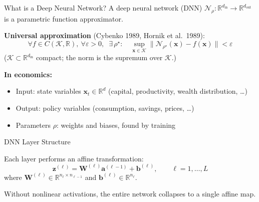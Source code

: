 \documentclass[aspectratio=169,11pt]{beamer}
\newcommand{\emphc}[1]{\textcolor{harvardcrimson}{#1}}
\newcommand{\x}{\bm{x}}
\newcommand{\bb}{\bm{b}}
\newcommand{\z}{\bm{z}}
\newcommand{\W}{\bm{W}}
\renewcommand{\a}{\bm{a}}
\newcommand{\R}{\mathbb{R}}
\begin{document}
\begin{frame}{What is a Deep Neural Network?}
A deep neural network (DNN) $\mathcal{N}_\rho : \R^{d_{\text{in}}} \to \R^{d_{\text{out}}}$ is a \emphc{parametric function approximator}.

\vspace{0.5em}
\textbf{Universal approximation} (Cybenko 1989, Hornik et al.\ 1989):
\[
\forall f \in C(\mathcal{K},\R),\ \forall\varepsilon > 0,\;\; \exists\, \rho^\star : \quad \sup_{\x\in\mathcal{K}}\bigl\|\mathcal{N}_{\rho^\star}(\x) - f(\x)\bigr\| < \varepsilon
\]
{\scriptsize ($\mathcal{K}\subset\R^{d_{\mathrm{in}}}$ compact; the norm is the supremum over $\mathcal{K}$.)}

\vspace{0.5em}
\textbf{In economics:}
\begin{itemize}
    \item \emphc{Input:} state variables $\x_t \in \R^{d}$ (capital, productivity, wealth distribution, \ldots)
    \item \emphc{Output:} policy variables (consumption, savings, prices, \ldots)
    \item \emphc{Parameters} $\rho$: weights and biases, found by \emphc{training}
\end{itemize}
\end{frame}

\begin{frame}{DNN Layer Structure}
\begin{center}
\end{center}

\vspace{0.4em}
Each layer performs an \emphc{affine transformation}:
\[
\z^{(\ell)} = \W^{(\ell)} \a^{(\ell-1)} + \bb^{(\ell)}, \qquad \ell = 1, \ldots, L
\]
where $\W^{(\ell)} \in \R^{n_\ell \times n_{\ell-1}}$ and $\bb^{(\ell)} \in \R^{n_\ell}$.

\vspace{0.3em}
{\small Without nonlinear activations, the entire network collapses to a single affine map.}
\end{frame}
\end{document}
